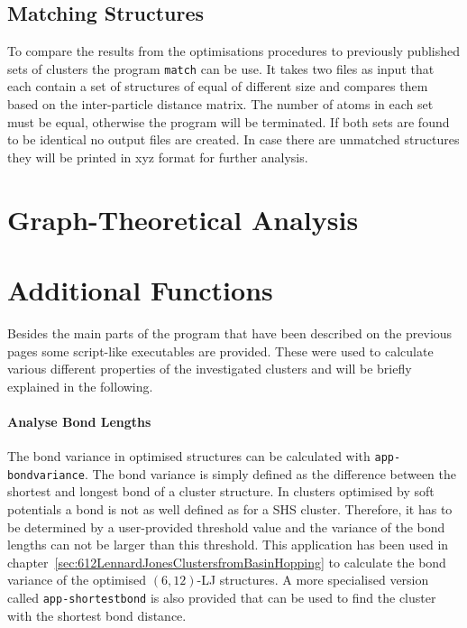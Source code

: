 \subsection{Matching Structures}
\label{sec:matchingstructures}

To compare the results from the optimisations procedures to previously
published sets of clusters the program \verb|match| can be use. It takes two
files as input that each contain a set of structures of equal of different size
and compares them based on the inter-particle distance matrix. The number of
atoms in each set must be equal, otherwise the program will be terminated. If
both sets are found to be identical no output files are created. In case there
are unmatched structures they will be printed in xyz format for further
analysis.

\section{Graph-Theoretical Analysis}
\label{sec:GraphTheoreticalAnalysis}



\section{Additional Functions}
\label{sec:AdditionalFunctions}

Besides the main parts of the program that have been described on the previous
pages some script-like executables are provided. These were used to calculate
various different properties of the investigated clusters and will be briefly
explained in the following.

\paragraph{Analyse Bond Lengths}%
The bond variance in optimised structures can be calculated with
\texttt{app-bondvariance}. The bond variance is simply defined as the
difference between the shortest and longest bond of a cluster structure. In
clusters optimised by soft potentials a bond is not as well defined as for a
\ac{SHS} cluster. Therefore, it has to be determined by a user-provided
threshold value and the variance of the bond lengths can not be larger than
this threshold. This application has been used in
chapter~\ref{sec:612LennardJonesClustersfromBasinHopping} to calculate the bond
variance of the optimised $(6,12)$-\ac{LJ} structures. A more specialised
version called \texttt{app-shortestbond} is also provided that can be used to
find the cluster with the shortest bond distance.

